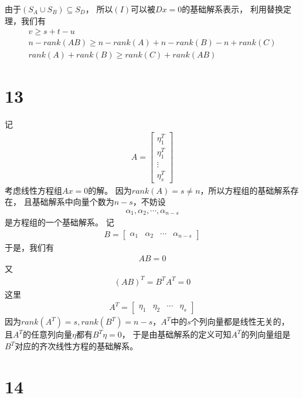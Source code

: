 \documentclass{article}
\begin{document}
由于$(S_A \cup S_B) \subseteq S_D$，
所以$(I)$可以被$Dx = 0$的基础解系表示，
利用替换定理，我们有
\begin{align*}
  v \geq s + t - u \\
  n - rank(AB) \geq n - rank(A) + n - rank(B) - n + rank(C) \\
  rank(A) + rank(B) \geq rank(C) + rank(AB)
\end{align*}

\section*{13}

记
\begin{align*}
  A = \begin{bmatrix}
        \eta_1^T \\
        \eta_1^T \\
        \vdots   \\
        \eta_s^T
      \end{bmatrix}
\end{align*}
考虑线性方程组$Ax = 0$的解。
因为$rank(A) = s \neq n$，所以方程组的基础解系存在，
且基础解系中向量个数为$n - s$，不妨设
\begin{align*}
  \alpha_1, \alpha_2, \cdots, \alpha_{n - s}
\end{align*}
是方程组的一个基础解系。
记
\begin{align*}
  B = \begin{bmatrix}
        \alpha_1 & \alpha_2 & \cdots & \alpha_{n - s}
      \end{bmatrix}
\end{align*}
于是，我们有
\begin{align*}
  A B = 0
\end{align*}
又
\begin{align*}
  (AB)^T = B^T A^T = 0
\end{align*}
这里
\begin{align*}
  A^T = \begin{bmatrix}
          \eta_1 & \eta_2 & \cdots & \eta_s
        \end{bmatrix}
\end{align*}
因为$rank(A^T) = s, rank(B^T) = n - s$，$A^T$中的$s$个列向量都是线性无关的，
且$A^T$的任意列向量$\eta$都有$B^T \eta = 0$，
于是由基础解系的定义可知$A^T$的列向量组是$B^T$对应的齐次线性方程的基础解系。

\section*{14}
\end{document}
